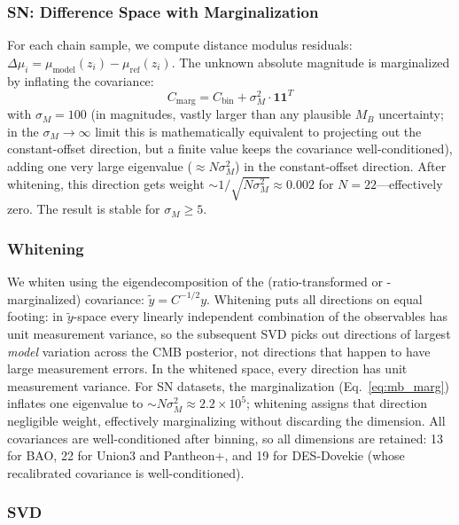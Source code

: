 \subsubsection{SN: Difference Space with \MB Marginalization}
\label{sec:mb_marg}

For each chain sample, we compute distance modulus residuals: $\Delta\mu_i = \mu_\mathrm{model}(z_i) - \mu_\mathrm{ref}(z_i)$. The unknown absolute magnitude \MB is marginalized by inflating the covariance:
\begin{equation}
C_\mathrm{marg} = C_\mathrm{bin} + \sigma_M^2 \cdot \mathbf{1}\mathbf{1}^T
\label{eq:mb_marg}
\end{equation}
with $\sigma_M = 100$ (in magnitudes, vastly larger than any plausible $M_B$ uncertainty; in the $\sigma_M \to \infty$ limit this is mathematically equivalent to projecting out the constant-offset direction, but a finite value keeps the covariance well-conditioned), adding one very large eigenvalue ($\approx N \sigma_M^2$) in the constant-offset direction. After whitening, this direction gets weight $\sim 1/\sqrt{N\sigma_M^2} \approx 0.002$ for $N = 22$---effectively zero. The result is stable for $\sigma_M \geq 5$.

\subsubsection{Whitening}

We whiten using the eigendecomposition of the (ratio-transformed or \MB-marginalized) covariance: $\tilde{y} = C^{-1/2} y$. Whitening puts all directions on equal footing: in $\tilde y$-space every linearly independent combination of the observables has unit measurement variance, so the subsequent SVD picks out directions of largest \emph{model} variation across the CMB posterior, not directions that happen to have large measurement errors. In the whitened space, every direction has unit measurement variance. For SN datasets, the \MB marginalization (Eq.~\ref{eq:mb_marg}) inflates one eigenvalue to $\sim N\sigma_M^2 \approx 2.2 \times 10^5$; whitening assigns that direction negligible weight, effectively marginalizing \MB without discarding the dimension. All covariances are well-conditioned after binning, so all dimensions are retained: 13 for BAO, 22 for Union3 and Pantheon+, and 19 for DES-Dovekie (whose recalibrated covariance \citep{Popovic2025} is well-conditioned).

\subsubsection{SVD}


